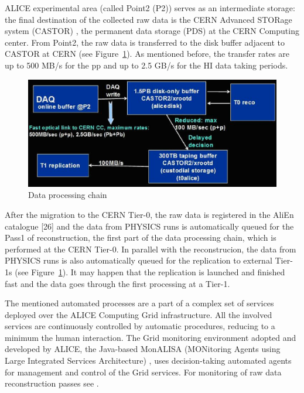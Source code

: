 ALICE experimental area (called Point2 (P2)) serves as an
intermediate storage: the final destination of the collected raw
data is the CERN Advanced STORage system (CASTOR) , the permanent
data storage (PDS) at the CERN Computing center. From Point2, the
raw data is transferred to the disk buffer adjacent to CASTOR at
CERN (see Figure~\ref{fig11}). As mentioned before, the transfer
rates are up to 500 MB/s for the pp and up to 2.5 GB/s for the HI
data taking periods.

\begin{figure}[htb] %
\centering
\includegraphics[width=13cm]{fig11.eps} %
\caption{Data processing chain}\label{fig11}
\end{figure}



After the migration to the CERN Tier-0, the raw data is registered
in the AliEn catalogue [26] and the data from PHYSICS runs is
automatically queued for the Pass1 of reconstruction, the first part
of the data processing chain, which is performed at the CERN Tier-0.
In parallel with the reconstrucion, the data from PHYSICS runs is also
automatically queued for the replication to external Tier-1s (see
Figure~\ref{fig11}). It may happen that the replication is launched
and finished fast and the data goes through the first processing at
a Tier-1.

The mentioned automated processes are a part of a complex set of
services deployed over the ALICE Computing Grid infrastructure. All
the involved services are continuously controlled by automatic
procedures, reducing to a minimum the human interaction. The Grid
monitoring environment adopted and developed by ALICE, the
Java-based MonALISA (MONitoring Agents using Large Integrated
Services Architecture) \cite{MonALISA}, uses decision-taking automated agents
for management and control of the Grid services. For monitoring of
raw data reconstruction passes see \cite{ALICE_PROD}.

